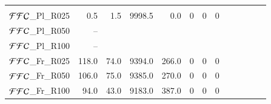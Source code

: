 \documentclass[aa]{lib/aa}
\begin{document}
\begin{table}
\begin{tabular}{lrrrrrrrrrrrr}
  \hline
  \hline \vspace{-0.75em}\\
${\cal FFC}$\_Pl\_R025 &   0.5 & 1.5 & 9998.5 & 0.0 & 0 & 0 & 0 \\ %
${\cal FFC}$\_Pl\_R050 & -- \\ %
${\cal FFC}$\_Pl\_R100 & -- \\ %
${\cal FFC}$\_Fr\_R025 &  118.0 & 74.0 & 9394.0 & 266.0 & 0 & 0 & 0 \\ %
${\cal FFC}$\_Fr\_R050 &  106.0 & 75.0 & 9385.0 & 270.0 & 0 & 0 & 0 \\ %
${\cal FFC}$\_Fr\_R100 &   94.0 & 43.0 & 9183.0 & 387.0 & 0 & 0 & 0 \\ %

  \hline
 \end{tabular}
\end{table}
\end{document}
